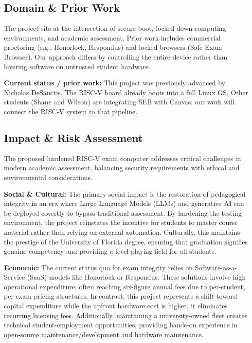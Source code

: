 \documentclass[11pt]{article}
\begin{document}
\subsection{Domain \& Prior Work}

The project sits at the intersection of secure boot, locked-down computing environments, and academic assessment. Prior work includes commercial proctoring (e.g., Honorlock, Respondus) and locked browsers (Safe Exam Browser). Our approach differs by controlling the entire device rather than layering software on untrusted student hardware.

\textbf{Current status / prior work:} This project was previously advanced by Nicholas DeSanctis. The RISC-V board already boots into a full Linux OS. Other students (Shane and Wilson) are integrating SEB with Canvas; our work will connect the RISC-V system to that pipeline.

\subsection{Impact \& Risk Assessment}

The proposed hardened RISC-V exam computer addresses critical challenges in modern academic assessment, balancing security requirements with ethical and environmental considerations.

\textbf{Social \& Cultural:} 
The primary social impact is the restoration of pedagogical integrity in an era where Large Language Models (LLMs) and generative AI can be deployed covertly to bypass traditional assessment. 
By hardening the testing environment, the project reinstates the incentive for students to master course material rather than relying on external automation. 
Culturally, this maintains the prestige of the University of Florida degree, ensuring that graduation signifies genuine competency and providing a level playing field for all students.

\textbf{Economic:} 
The current status quo for exam integrity relies on Software-as-a-Service (SaaS) models like Honorlock or Respondus. 
These solutions involve high operational expenditure, often reaching six-figure annual fees due to per-student, per-exam pricing structures. 
In contrast, this project represents a shift toward capital expenditure while the upfront hardware cost is higher, it eliminates recurring licensing fees. 
Additionally, maintaining a university-owned fleet creates technical student-employment opportunities, providing hands-on experience in open-source maintenance/development and hardware maintenance.
\end{document}
